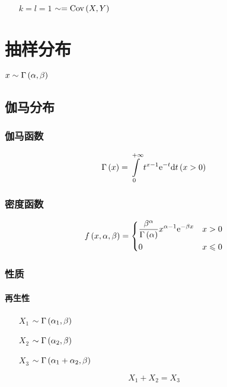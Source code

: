 \documentclass{article}
\begin{document}
\begin{enumerate}
    \item [$k=l=1$] $\sim=\mathrm{Cov}\left(X,Y\right)$
\end{enumerate}

\section{抽样分布}

$x\sim\Gamma\left(\alpha,\beta\right)$

\subsection{伽马分布}

\subsubsection{伽马函数}

\[\Gamma\left(x\right)=\int\limits_0^{+\infty}t^{x-1}\mathrm e^{-t}\mathrm d t\left(x>0\right)\]

\subsubsection{密度函数}

\[f\left(x,\alpha,\beta\right)=
    \left\{\begin{aligned}
         & \frac{\beta^\alpha}{\Gamma\left(\alpha\right)}x^{\alpha-1}\mathrm e^{-\beta x} &  & x>0         \\
         & 0                                                              &  & x\leqslant0
    \end{aligned}\right.\]

\subsubsection{性质}

\paragraph{再生性}

\begin{enumerate}
    \item [$X_1$] $\sim\Gamma\left(\alpha_1,\beta\right)$
    \item [$X_2$] $\sim\Gamma\left(\alpha_2,\beta\right)$
    \item [$X_3$] $\sim\Gamma\left(\alpha_1+\alpha_2,\beta\right)$
\end{enumerate}

\[X_1+X_2=X_3\]
\end{document}
